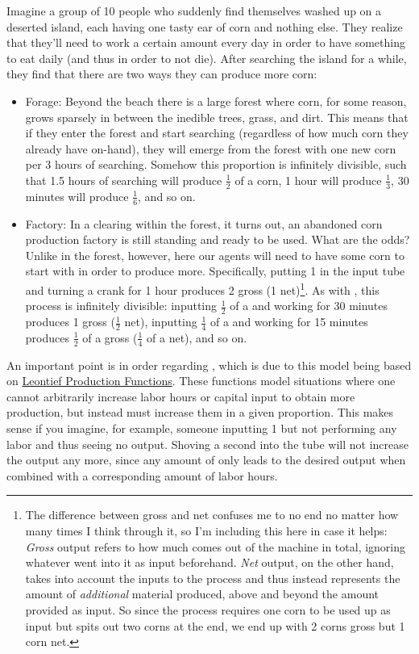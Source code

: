 Imagine a group of 10 people who suddenly find themselves washed up on a deserted island, each having one tasty ear of corn and nothing else. They realize that they'll need to work a certain amount every day in order to have something to eat daily (and thus in order to not die). After searching the island for a while, they find that there are two ways they can produce more corn:
\begin{itemize}
	\item \textsf{Forage}: Beyond the beach there is a large forest where corn, for some reason, grows sparsely in between the inedible trees, grass, and dirt. This means that if they enter the forest and start searching (regardless of how much corn they already have on-hand), they will emerge from the forest with one new corn per 3 hours of searching. Somehow this proportion is infinitely divisible, such that 1.5 hours of searching will produce $\frac{1}{2}$ of a corn, 1 hour will produce $\frac{1}{3}$, 30 minutes will produce $\frac{1}{6}$, and so on.
	\item \textsf{Factory}: In a clearing within the forest, it turns out, an abandoned corn production factory is still standing and ready to be used. What are the odds? Unlike in the forest, however, here our agents will need to have some corn to start with in order to produce more. Specifically, putting 1 \Corn{} in the input tube and turning a crank for 1 hour produces 2  gross (1 \Corn{} net)\footnote{The difference between gross and net confuses me to no end no matter how many times I think through it, so I'm including this here in case it helps: \textit{Gross} output refers to how much comes out of the machine in total, ignoring whatever went into it as input beforehand. \textit{Net} output, on the other hand, takes into account the inputs to the process and thus instead represents the amount of \textit{additional} material produced, above and beyond the amount provided as input. So since the  process requires one corn to be used up as input but spits out two corns at the end, we end up with 2 corns gross but 1 corn net.}. As with , this process is infinitely divisible: inputting $\frac{1}{2}$ of a \Corn{} and working for 30 minutes produces 1 \Corn{} gross ($\frac{1}{2}$ \Corn{} net), inputting $\frac{1}{4}$ of a \Corn{} and working for 15 minutes produces $\frac{1}{2}$ of a \Corn{} gross ($\frac{1}{4}$ of a \Corn{} net), and so on.
\end{itemize}

An important point is in order regarding , which is due to this model being based on \href{https://en.wikipedia.org/wiki/Leontief\_production\_function}{Leontief Production Functions}. These functions model situations where one cannot arbitrarily increase labor hours or capital input to obtain more production, but instead must increase them in a given proportion. This makes sense if you imagine, for example, someone inputting 1 \Corn{} but not performing any labor and thus seeing no output. Shoving a second \Corn{} into the tube will not increase the output any more, since any amount of \Corn{} only leads to the desired output when combined with a corresponding amount of labor hours.


